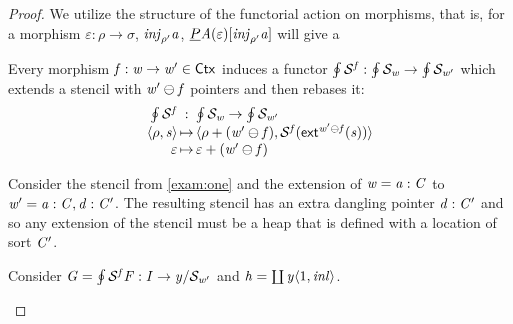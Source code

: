 \begin{proof}
We utilize the structure of the functorial action on morphisms, that is,
for a morphism $\varepsilon : \rho \to \sigma$, $\mathit{inj}_{\rho'}\mathit{a}$, $\underline{P}\mathit{A}(\varepsilon)[\mathit{inj}_{\rho'}\mathit{a}]$ will give a 

Every morphism $\mathit{f} : \mathit{w} \to \mathit{w}' \in \mathsf{Ctx}$ induces a functor $\oint{\mathcal{S}^{\mathit{f}}} : \oint{\mathcal{S}_{\mathit{w}}} \to \oint{\mathcal{S}_{\mathit{w}'}}$
which extends a stencil with $\mathit{w}' \ominus \mathit{f}$ pointers and then rebases it: 
\[\begin{array}{r@{\,}c@{\,}l}
    \rebaseF\vf & : & \coeC{\stencilF\vw} \to \coeC{\stencilF{\vw'}} \\
    \tup\rho\vs & \mapsto & \tup{\extFNB\rho{(\vw' \ominus \vf)}}{\stencilRebase\vf(\extNat\nop{\vw' \ominus \vf}(\vs))} \\
    \varepsilon & \mapsto & \extFNB\varepsilon{(\vw' \ominus \vf)}
\end{array}\]

\begin{example}
    Consider the stencil from \cref{exam:one} and the extension of $\mathit{w} = \mathit{a} : \mathit{C}$ to $\mathit{w}' = \mathit{a} : \mathit{C}, \mathit{d} : \mathit{C}'$.
    The resulting stencil has an extra dangling pointer $\mathit{d} : \mathit{C}'$ and so any extension of the stencil must be a heap that is defined with a location of sort $\mathit{C}'$. 
\begin{center}
\end{center}
\end{example}

    Consider $\mathit{G} = \oint{\mathcal{S}^{\mathit{f}}}\mathit{F} : \mathit{I} \to {\mathit{y}}/{\mathcal{S}_{\mathit{w}'}}$ and $\mathit{h} = \coprod{\mathit{y}\langle 1 , \mathit{inl}\rangle}$.
\begin{center}
\end{center}


\end{proof}
